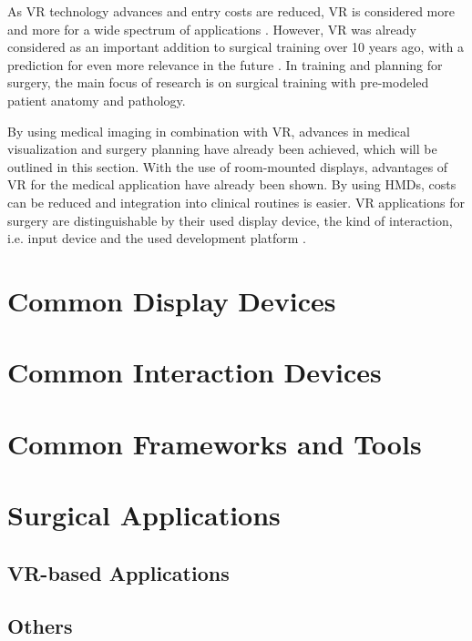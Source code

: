 As VR technology advances and entry costs are reduced, VR is considered more and more for a wide spectrum of applications \cite{Ayoub.2019, Berni.2020}.
However, VR was already considered as an important addition to surgical training over 10 years ago, with a prediction for even more relevance in the future \cite{RN60}.
In training and planning for surgery, the main focus of research is on surgical training with pre-modeled patient anatomy and pathology.

By using medical imaging in combination with VR, advances in medical visualization and surgery planning have already been achieved, which will be outlined in this section.
With the use of room-mounted displays, advantages of VR for the medical application have already been shown.
By using HMDs, costs can be reduced and integration into clinical routines is easier.
VR applications for surgery are distinguishable by their used display device, the kind of interaction, i.e. input device and the used development platform \cite{Vaughan.2016}.

\section{\label{sec::DisplayDevices}Common Display Devices}


\section{\label{sec::InteractionDevices}Common Interaction Devices}%


\section{\label{sec::FrameworksAndTools}Common Frameworks and Tools}


\section{\label{sec::SurgicalApplications}Surgical Applications}

\subsection{\label{sec::VRBasedApplications}VR-based Applications}


\subsection{\label{sec::Others}Others}%

